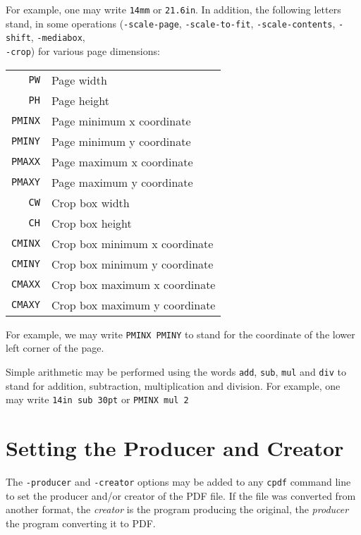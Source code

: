 \documentclass{book}
\begin{document}
\noindent For example, one may write \texttt{14mm} or \texttt{21.6in}. In addition, the following letters stand, in some operations (\texttt{-scale-page}, \texttt{-scale-to-fit}, \texttt{-scale-contents}, \texttt{-shift}, \texttt{-mediabox},\\ \texttt{-crop}) for various page dimensions:

\begin{table}[h]
\centering
\begin{tabular}{rl}
  \texttt{PW} & Page width\\
  \texttt{PH} & Page height\\
  \texttt{PMINX} & Page minimum x coordinate\\
  \texttt{PMINY} & Page minimum y coordinate\\
  \texttt{PMAXX} & Page maximum x coordinate\\
  \texttt{PMAXY} & Page maximum y coordinate\\
  \texttt{CW} & Crop box width\\
  \texttt{CH} & Crop box height\\
  \texttt{CMINX} & Crop box minimum x coordinate\\
  \texttt{CMINY} & Crop box minimum y coordinate\\
  \texttt{CMAXX} & Crop box maximum x coordinate\\
  \texttt{CMAXY} & Crop box maximum y coordinate
\end{tabular}
\end{table}

\noindent For example, we may write \texttt{PMINX PMINY} to stand for the coordinate of the lower left corner of the page.

Simple arithmetic may be performed using the words \texttt{add}, \texttt{sub}, \texttt{mul} and \texttt{div} to stand for addition, subtraction, multiplication and division. For example, one may write \texttt{14in\hspace{-1mm} sub\hspace{-1mm} 30pt} or \texttt{PMINX\hspace{-1mm} mul\hspace{-1mm} 2}

\section{Setting the Producer and Creator}

The \texttt{-producer} and \texttt{-creator} options may be added to any \texttt{cpdf} command line to set the producer and/or creator of the PDF file. If the file was converted from another format, the \textit{creator} is the program producing the original, the \textit{producer} the program converting it to PDF.
\end{document}
